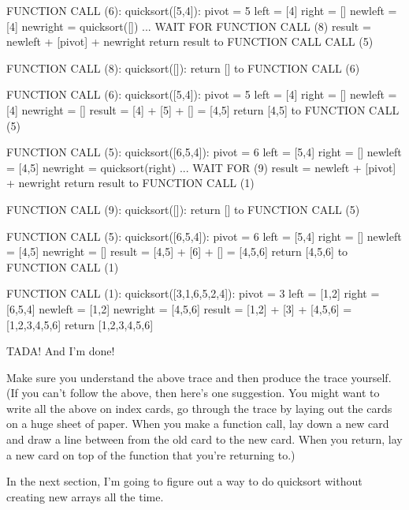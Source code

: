 \begin{console}
FUNCTION CALL (6): quicksort([5,4]):
pivot = 5
left = [4]
right = []
newleft = [4]
newright = quicksort([]) ... WAIT FOR FUNCTION CALL (8)
result = newleft + [pivot] + newright
return result to FUNCTION CALL CALL (5)
\end{console}
\begin{console}
FUNCTION CALL (8): quicksort([]):
return [] to FUNCTION CALL (6)
\end{console}
\begin{console}
FUNCTION CALL (6): quicksort([5,4]):
pivot = 5
left = [4]
right = []
newleft = [4]
newright = []
result = [4] + [5] + [] = [4,5]
return [4,5] to FUNCTION CALL (5)
\end{console}
\begin{console}
FUNCTION CALL (5): quicksort([6,5,4]):
pivot = 6
left = [5,4]
right = []
newleft = [4,5]
newright = quicksort(right) ... WAIT FOR (9)
result = newleft + [pivot] + newright
return result to FUNCTION CALL (1)
\end{console}
\begin{console}
FUNCTION CALL (9): quicksort([]):
return [] to FUNCTION CALL (5)
\end{console}
\begin{console}
FUNCTION CALL (5): quicksort([6,5,4]):
pivot = 6
left = [5,4]
right = []
newleft = [4,5]
newright = []
result = [4,5] + [6] + [] = [4,5,6]
return [4,5,6] to FUNCTION CALL (1)
\end{console}
\begin{console}
FUNCTION CALL (1): quicksort([3,1,6,5,2,4]):
pivot = 3
left = [1,2]
right = [6,5,4]
newleft = [1,2]
newright = [4,5,6]
result = [1,2] + [3] + [4,5,6] = [1,2,3,4,5,6]
return [1,2,3,4,5,6]
\end{console}


TADA! And I'm done!

Make sure you understand the above trace and then
produce the trace yourself.
(If you can't follow the above, then here's 
one suggestion. 
You might want to write all the above on index cards, 
go through the trace by laying out the cards on a 
huge sheet of paper.
When you make a function call,
lay down a new card and 
draw a line between from the old card to the new card.
When you return, lay a new card on top of the function 
that you're returning to.)

In the next section, I'm going to figure out a way to do quicksort
without creating new arrays all the time.


